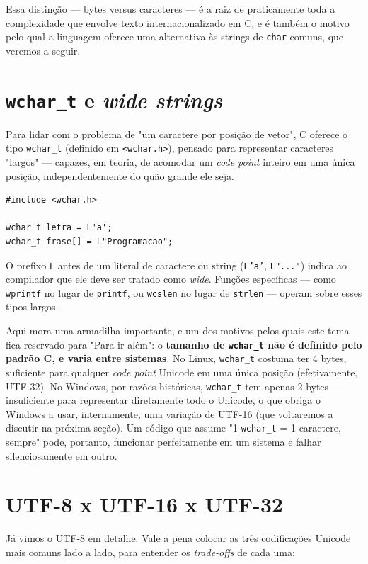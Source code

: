 \documentclass[12pt,a4paper,oneside]{extreport}
\begin{document}
Essa distinção — bytes versus caracteres — é a raiz de praticamente toda a complexidade que envolve texto internacionalizado em C, e é também o motivo pelo qual a linguagem oferece uma alternativa às strings de \texttt{char} comuns, que veremos a seguir.

\section*{\texttt{wchar\_t} e \textit{wide strings}}

Para lidar com o problema de "um caractere por posição de vetor", C oferece o tipo \texttt{wchar\_t} (definido em \texttt{<wchar.h>}), pensado para representar caracteres "largos" — capazes, em teoria, de acomodar um \textit{code point} inteiro em uma única posição, independentemente do quão grande ele seja.

\begin{lstlisting}
#include <wchar.h>

wchar_t letra = L'a';
wchar_t frase[] = L"Programacao";
\end{lstlisting}

O prefixo \texttt{L} antes de um literal de caractere ou string (\texttt{L'a'}, \texttt{L"..."}) indica ao compilador que ele deve ser tratado como \textit{wide}. Funções específicas — como \texttt{wprintf} no lugar de \texttt{printf}, ou \texttt{wcslen} no lugar de \texttt{strlen} — operam sobre esses tipos largos.

Aqui mora uma armadilha importante, e um dos motivos pelos quais este tema fica reservado para "Para ir além": o \textbf{tamanho de \texttt{wchar\_t} não é definido pelo padrão C, e varia entre sistemas}. No Linux, \texttt{wchar\_t} costuma ter 4 bytes, suficiente para qualquer \textit{code point} Unicode em uma única posição (efetivamente, UTF-32). No Windows, por razões históricas, \texttt{wchar\_t} tem apenas 2 bytes — insuficiente para representar diretamente todo o Unicode, o que obriga o Windows a usar, internamente, uma variação de UTF-16 (que voltaremos a discutir na próxima seção). Um código que assume "1 \texttt{wchar\_t} = 1 caractere, sempre" pode, portanto, funcionar perfeitamente em um sistema e falhar silenciosamente em outro.

\section*{UTF-8 x UTF-16 x UTF-32}

Já vimos o UTF-8 em detalhe. Vale a pena colocar as três codificações Unicode mais comuns lado a lado, para entender os \textit{trade-offs} de cada uma:
\end{document}

